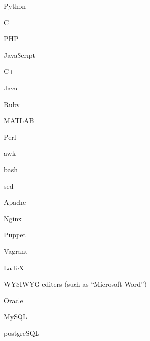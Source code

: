 \begin{technicalSkills}

{
    \item Python
    \item C
    \item PHP
    \item JavaScript
    \item C++
    \item Java
    \item Ruby
    \item MATLAB
    \item Perl
}

{
    \item awk
    \item bash
    \item sed
}

{
    \item Apache
    \item Nginx
    \item Puppet
    \item Vagrant
}

{
    \item \LaTeX
    \item WYSIWYG editors (such as ``Microsoft Word'')
}

{
    \item Oracle
    \item MySQL
    \item postgreSQL
}

\end{technicalSkills}
